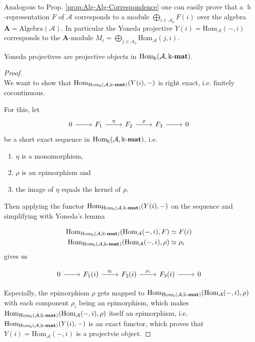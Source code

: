 Analogous to Prop. \ref{prop:Alg-Alg-Correspondence} one can easily prove that a $\Bbbk$-representation $F$ of $\mathcal{A}$ corresponds to a 
module $\bigoplus_{i \in \mathcal{A}_{0}} F(i)$ over the algebra $\mathbf{A} = \mathrm{Algebra}(\mathcal{A})$.
In particular the Yoneda projective $Y(i) = \mathrm{Hom}_{\mathcal{A}}(-,i)$ corresponds to the $\mathbf{A}$-module
$M_{i} = \bigoplus_{j \in \mathcal{A}_{0}} \mathrm{Hom}_{\mathcal{A}}(j,i)$.

\begin{lemma}
Yoneda projectives are projective objects in $\mathrm{Hom_{\Bbbk}}(\mathcal{A},\Bbbk\textnormal{-}\mathbf{mat})$.
\end{lemma}
\begin{proof}\phantom{}\\
We want to show that $\mathrm{Hom}_{\mathrm{Hom_{\Bbbk}}(\mathcal{A},\Bbbk\textnormal{-}\mathbf{mat})}(Y(i),-)$ is right exact, i.e. finitely cocontinuous.

\noindent For this, let
\[
\begin{tikzcd}
0 \arrow[r] & F_{1} \arrow[r, "\eta"] & F_{2} \arrow[r,"\rho"] & F_{3} \arrow[r] & 0
\end{tikzcd}
\]
be a short exact sequence in $\mathrm{Hom_{\Bbbk}}(\mathcal{A},\Bbbk\textnormal{-}\mathbf{mat})$, i.e.
\begin{enumerate}
\item $\eta$ is a monomorphism,
\item $\rho$ is an epimorphism and
\item the image of $\eta$ equals the kernel of $\rho$.
\end{enumerate}

\noindent Then applying the functor $\mathrm{Hom}_{\mathrm{Hom_{\Bbbk}}(\mathcal{A},\Bbbk\textnormal{-}\mathbf{mat})}(Y(i),-)$ on the sequence and simplifying with Yoneda's lemma

\begin{align*}
\mathrm{Hom}_{\mathrm{Hom_{\Bbbk}}(\mathcal{A},\Bbbk\textnormal{-}\mathbf{mat})}(\mathrm{Hom}_{\mathcal{A}}(-,i),F) &\simeq F(i) \\
\mathrm{Hom}_{\mathrm{Hom_{\Bbbk}}(\mathcal{A},\Bbbk\textnormal{-}\mathbf{mat})}(\mathrm{Hom}_{\mathcal{A}}(-,i),\rho) &\simeq \rho_{i}
\end{align*}
gives us

\[
\begin{tikzcd}
0 \arrow[r] & F_{1}(i) \arrow[r, "\eta_{i}"] &
F_{2}(i) \arrow[r,"\rho_{i}"] & F_{3}(i) \arrow[r] & 0
\end{tikzcd}
\]

\noindent Especially, the epimorphism $\rho$ gets mapped to $\mathrm{Hom}_{\mathrm{Hom_{\Bbbk}}(\mathcal{A},\Bbbk\textnormal{-}\mathbf{mat})}(\mathrm{Hom}_{\mathcal{A}}(-,i),\rho)$
with each component $\rho_{i}$ being an epimorphism, which makes $\mathrm{Hom}_{\mathrm{Hom_{\Bbbk}}(\mathcal{A},\Bbbk\textnormal{-}\mathbf{mat})}(\mathrm{Hom}_{\mathcal{A}}(-,i),\rho)$
itself an epimorphism, i.e. $\mathrm{Hom}_{\mathrm{Hom_{\Bbbk}}(\mathcal{A},\Bbbk\textnormal{-}\mathbf{mat})}(Y(i),-)$ is an exact functor, which
proves that $Y(i) = \mathrm{Hom}_{\mathcal{A}}(-,i)$ is a projectvie object.
\end{proof}

